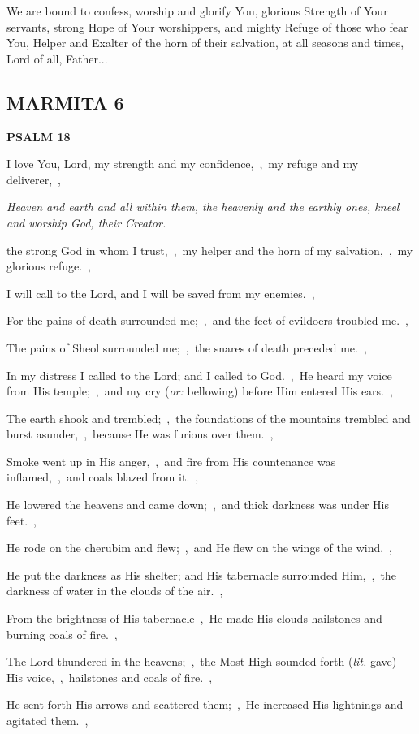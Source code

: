 \documentclass[12pt,twoside,a5paper]{article}
\newcommand{\marmita}[1]{\subsection*{MARMITA {#1}}}
\newcommand{\psalm}[1]{\textbf{PSALM {#1}}}
\newcommand{\qanona}[1]{{\liturgicalhint{Qanona.} \emph{#1}}}
\newcommand{\slota}[1]{\liturgicalhint{Slota.} #1}
\newcommand{\translationoption}[1]{\emph{or:} #1}
\newcommand{\translationliteral}[1]{\emph{lit.} #1}
\begin{document}
\slota{We are bound to confess, worship and glorify You, glorious Strength of Your servants, strong Hope of Your worshippers, and mighty Refuge of those who fear You, Helper and Exalter of the horn of their salvation, at all seasons and times, Lord of all, Father...}

\marmita{6}
\psalm{18}

\begin{normalparskip}
  I love You, Lord, my strength and my confidence,~\sep\ my refuge and my deliverer,~\sep

  \qanona{Heaven and earth and all within them, the heavenly and the earthly ones, kneel and worship God, their Creator.}

  the strong God in whom I trust,~\sep\ my helper and the horn of my salvation,~\sep\ my glorious refuge.~\sep

  I will call to the Lord, and I will be saved from my enemies.~\sep

  For the pains of death surrounded me;~\sep\ and the feet of evildoers troubled me.~\sep

  The pains of Sheol surrounded me;~\sep\ the snares of death preceded me.~\sep

  In my distress I called to the Lord; and I called to God.~\sep\ He heard my voice from His temple;~\sep\ and my cry (\translationoption{bellowing}) before Him entered His ears.~\sep

  The earth shook and trembled;~\sep\ the foundations of the mountains trembled and burst asunder,~\sep\ because He was furious over them.~\sep

  Smoke went up in His anger,~\sep\ and fire from His countenance was inflamed,~\sep\ and coals blazed from it.~\sep

  He lowered the heavens and came down;~\sep\ and thick darkness was under His feet.~\sep

  He rode on the cherubim and flew;~\sep\ and He flew on the wings of the wind.~\sep

  He put the darkness as His shelter; and His tabernacle surrounded Him,~\sep\ the darkness of water in the clouds of the air.~\sep

  From the brightness of His tabernacle~\sep\ He made His clouds hailstones and burning coals of fire.~\sep

  The Lord thundered in the heavens;~\sep\ the Most High sounded forth (\translationliteral{gave}) His voice,~\sep\ hailstones and coals of fire.~\sep

  He sent forth His arrows and scattered them;~\sep\ He increased His lightnings and agitated them.~\sep


\end{normalparskip}
\end{document}
